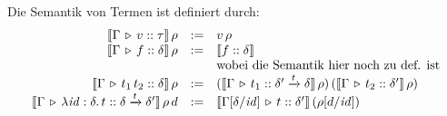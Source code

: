 \documentclass[12pt,a4paper,bigheadings]{scrartcl}
\newcommand{\semantic}[1]{\ensuremath{\llbracket#1\rrbracket}}
\newcommand{\tto}{\ensuremath{\xrightarrow{t}}}
\begin{document}
\pagebreak[3] \noindent
Die Semantik von Termen ist definiert durch:
\[\begin{array}{rcl}
  \semantic{\Tj{\Gamma}{v}{\tau}}\,\rho
  & := &
  v\,\rho
  \\
  \semantic{\Tj{\Gamma}{f}{\delta}}\,\rho
  & := &
  \semantic{\tj{f}{\delta}} \\
  && \text{wobei die Semantik hier noch zu def. ist}
  \\
  \semantic{\Tj{\Gamma}{\app{t_1}{t_2}}{\delta}}\,\rho
  & := &
  (\semantic{\Tj{\Gamma}{t_1}{\delta'\tto\delta}}\,\rho)\,(\semantic{\Tj{\Gamma}{t_2}{\delta'}}\,\rho)
  \\
  \semantic{\Tj{\Gamma}{\abstr{\id:\delta}{t}}{\delta\tto\delta'}}\,\rho\,d
  & := & 
  \semantic{\Tj{\Gamma[\delta/\id]}{t}{\delta'}}\,(\rho[d/\id])
\end{array}\]
\end{document}
